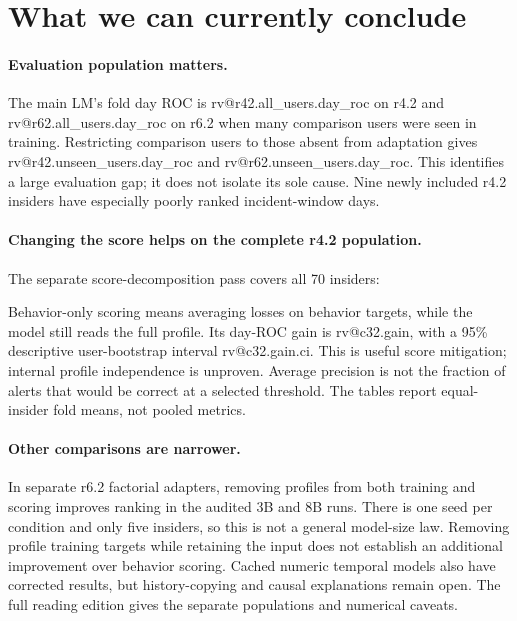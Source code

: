 \documentclass[10pt]{article}
\makeatletter
\newcommand{\rv}[1]{\csname rv@#1\endcsname}
\makeatother
\begin{document}
\section{What we can currently conclude}
\paragraph{Evaluation population matters.}
The main LM's fold day ROC is \rv{r42.all_users.day_roc} on r4.2 and
\rv{r62.all_users.day_roc} on r6.2 when many comparison users were seen in training.
Restricting comparison users to those absent from adaptation gives
\rv{r42.unseen_users.day_roc} and \rv{r62.unseen_users.day_roc}. This identifies a
large evaluation gap; it does not isolate its sole cause. Nine newly included
r4.2 insiders have especially poorly ranked incident-window days.

\paragraph{Changing the score helps on the complete r4.2 population.}
The separate score-decomposition pass covers all 70 insiders:
\begin{center}\end{center}
Behavior-only scoring means averaging losses on behavior targets, while the
model still reads the full profile. Its day-ROC gain is \rv{c32.gain}, with a
95\% descriptive user-bootstrap interval \rv{c32.gain.ci}. This is useful score
mitigation; internal profile independence is unproven. Average precision is not
the fraction of alerts that would be correct at a selected threshold. The tables
report equal-insider fold means, not pooled metrics.

\paragraph{Other comparisons are narrower.}
In separate r6.2 factorial adapters, removing profiles from both training and
scoring improves ranking in the audited 3B and 8B runs. There is one seed per
condition and only five insiders, so this is not a general model-size law.
Removing profile training targets while retaining the input does not establish
an additional improvement over behavior scoring. Cached numeric temporal models
also have corrected results, but history-copying and causal explanations remain
open. The full reading edition gives the separate populations and numerical caveats.
\end{document}
